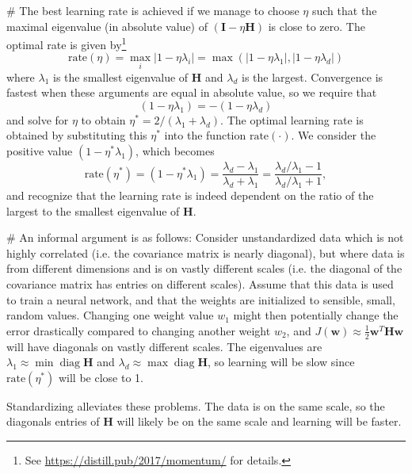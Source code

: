 \documentclass[12pt, a4paper]{article}
\newcommand{\vect}[1]{\bm{#1}}
\newcommand{\abs}[1]{\left\lvert#1\right\rvert}
\begin{document}
{\begin{easylist}[enumerate]
# The best learning rate is achieved if we manage to choose $\eta$ such that the maximal eigenvalue (in absolute value) of $\left( \vect{I} - \eta  \vect{H} \right)$ is close to zero.
The optimal rate is given by\footnote{See \url{https://distill.pub/2017/momentum/} for details.}
\begin{equation*}
	\text{rate}(\eta) = \max_i \abs{1 - \eta \lambda_i}
	= \max \left( \abs{1 - \eta \lambda_1} , \abs{1 - \eta \lambda_d}\right)
\end{equation*}
where $\lambda_1$ is the smallest eigenvalue of $\vect{H}$ and $\lambda_d$ is the largest.
Convergence is fastest when these arguments are equal in absolute value, so we require that
\begin{equation*}
	(1 - \eta \lambda_1) = - (1 - \eta \lambda_d)
\end{equation*}
and solve for $\eta$ to obtain $\eta^*= 2 / (\lambda_1 + \lambda_d)$.
The optimal learning rate is obtained by substituting this $\eta^*$ into the function $\text{rate}(\cdot)$.
We consider the positive value $(1 - \eta^* \lambda_1)$, which becomes
\begin{equation*}
	\text{rate}(\eta^*) = (1 - \eta^* \lambda_1) = \frac{\lambda_d - \lambda_1}{\lambda_d + \lambda_1} = \frac{ \lambda_d / \lambda_1 - 1}{\lambda_d / \lambda_1 + 1},
\end{equation*}
and recognize that the learning rate is indeed dependent on the ratio of the largest to the smallest eigenvalue of $\vect{H}$.

# An informal argument is as follows: Consider unstandardized data which is not highly correlated (i.e. the covariance matrix is nearly diagonal), but where data is from different dimensions and is on vastly different scales (i.e. the diagonal of the covariance matrix has entries on different scales).
Assume that this data is used to train a neural network, and that the weights are initialized to sensible, small, random values.
Changing one weight value $w_1$ might then potentially change the error drastically compared to changing another weight $w_2$, and $J(\vect{w}) \approx \frac{1}{2}\vect{w}^T \vect{H} \vect{w}$ will have diagonals on vastly different scales.
The eigenvalues are $\lambda_1 \approx \min \operatorname{diag} \vect{H}$ and $\lambda_d \approx \max \operatorname{diag} \vect{H}$, so learning will be slow since $\text{rate}(\eta^*)$ will be close to 1.

Standardizing alleviates these problems.
The data is on the same scale, so the diagonals entries of $\vect{H}$ will likely be on the same scale and learning will be faster.


\end{easylist}}
\end{document}
